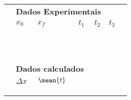 \begin{table*}[!ht]
\centering
\begin{tabular}{lp{25mm}p{25mm}p{25mm}p{25mm}p{25mm}l}
\toprule
	&\multicolumn{4}{l}{\textbf{Dados Experimentais}} \\
	\cmidrule{2-6}
	& $x_0$ & $x_f$ & $t_1$ & $t_2$ & $t_3$ & \\
	\cmidrule{2-6}
	& \cellcolor[gray]{0.89} & \cellcolor[gray]{0.92} & \cellcolor[gray]{0.89} & \cellcolor[gray]{0.92} & \cellcolor[gray]{0.89} \\
	& \cellcolor[gray]{0.95} & \cellcolor[gray]{0.97} & \cellcolor[gray]{0.95} & \cellcolor[gray]{0.97} & \cellcolor[gray]{0.95} \\
	& \cellcolor[gray]{0.89} & \cellcolor[gray]{0.92} & \cellcolor[gray]{0.89} & \cellcolor[gray]{0.92} & \cellcolor[gray]{0.89} \\
	& \cellcolor[gray]{0.95} & \cellcolor[gray]{0.97} & \cellcolor[gray]{0.95} & \cellcolor[gray]{0.97} & \cellcolor[gray]{0.95} \\
	& \cellcolor[gray]{0.89} & \cellcolor[gray]{0.92} & \cellcolor[gray]{0.89} & \cellcolor[gray]{0.92} & \cellcolor[gray]{0.89} \\
	& \cellcolor[gray]{0.95} & \cellcolor[gray]{0.97} & \cellcolor[gray]{0.95} & \cellcolor[gray]{0.97} & \cellcolor[gray]{0.95} \\
	& \cellcolor[gray]{0.89} & \cellcolor[gray]{0.92} & \cellcolor[gray]{0.89} & \cellcolor[gray]{0.92} & \cellcolor[gray]{0.89} \\
	& \cellcolor[gray]{0.95} & \cellcolor[gray]{0.97} & \cellcolor[gray]{0.95} & \cellcolor[gray]{0.97} & \cellcolor[gray]{0.95} \\
	& \cellcolor[gray]{0.89} & \cellcolor[gray]{0.92} & \cellcolor[gray]{0.89} & \cellcolor[gray]{0.92} & \cellcolor[gray]{0.89} \\
	& \cellcolor[gray]{0.95} & \cellcolor[gray]{0.97} & \cellcolor[gray]{0.95} & \cellcolor[gray]{0.97} & \cellcolor[gray]{0.95} \\
	\cmidrule{2-6}
\\
	& \multicolumn{3}{l}{\textbf{Dados calculados}} \\
	\cmidrule{2-3}
	& $\Delta x$ & $\mean{t}$ \\
	\cmidrule{2-3}
	& \cellcolor[gray]{0.89} & \cellcolor[gray]{0.92} \\ 
	& \cellcolor[gray]{0.95} & \cellcolor[gray]{0.97} \\ 
	& \cellcolor[gray]{0.89} & \cellcolor[gray]{0.92} \\ 

\end{tabular}
\end{table*}
